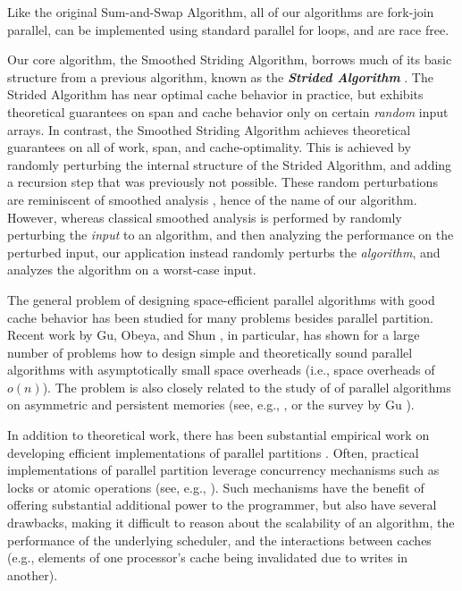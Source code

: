 \documentclass[a4paper,UKenglish,cleveref, autoref, thm-restate]{lipics-v2019}
\newcommand{\defn}[1]{{\textit{\textbf{\boldmath #1}}}}
\renewcommand{\paragraph}[1]{\vspace{0.09in}\noindent{\bf \boldmath #1.}}
\begin{document}
Like the original Sum-and-Swap Algorithm, all of our algorithms are
fork-join parallel, can be implemented using standard parallel for
loops, and are race free.

\paragraph{Related Work}
Our core algorithm, the Smoothed Striding Algorithm, borrows much of
its basic structure from a previous algorithm, known as the
\defn{Strided Algorithm} \cite{FrancisPa92, Frias08}. The Strided
Algorithm has near optimal cache behavior in practice, but exhibits
theoretical guarantees on span and cache behavior only on certain
\emph{random} input arrays. In contrast, the Smoothed Striding
Algorithm achieves theoretical guarantees on all of work, span, and
cache-optimality. This is achieved by randomly perturbing the internal
structure of the Strided Algorithm, and adding a recursion step that
was previously not possible. These random perturbations are
reminiscent of smoothed analysis \cite{Smoothed1, Smoothed2,
  Smoothed3, Smoothed4, Smoothed5, Smoothed6}, hence of the name of our
algorithm. However, whereas classical smoothed analysis is performed
by randomly perturbing the \emph{input} to an algorithm, and then
analyzing the performance on the perturbed input, our application
instead randomly perturbs the \emph{algorithm}, and analyzes the
algorithm on a worst-case input.

The general problem of designing space-efficient parallel algorithms
with good cache behavior has been studied for many problems
\cite{blelloch2020improved, ParallelCacheAlg1, ParallelCacheAlg2,
  ParallelCacheAlg3, ParallelCacheAlg4, ParallelCacheAlg5,
  ParallelCacheAlg6} besides parallel partition. Recent work by Gu,
Obeya, and Shun \cite{inplace}, in particular, has shown for a large
number of problems how to design simple and theoretically sound
parallel algorithms with asymptotically small space overheads (i.e.,
space overheads of $o(n)$).  The problem is also closely related to
the study of of parallel algorithms on asymmetric and persistent
memories (see, e.g.,
\cite{blelloch2018parallel,ben2016parallel,blelloch2015sorting,gu2018survey,blelloch2018parallel2},
or the survey by Gu \cite{gu2018survey}).


In addition to theoretical work, there has been substantial empirical
work on developing efficient implementations of parallel partitions
\cite{HeidelbergerNo90, AxtmannWi17, TsigasZh03, FrancisPa92,
  Frias08}. Often, practical implementations of parallel partition
leverage concurrency mechanisms such as locks or atomic operations
(see, e.g., \cite{HeidelbergerNo90,AxtmannWi17,TsigasZh03}). Such
mechanisms have the benefit of offering substantial additional power
to the programmer, but also have several drawbacks, making it
difficult to reason about the scalability of an algorithm, the
performance of the underlying scheduler, and the interactions between
caches (e.g., elements of one processor's cache being invalidated due
to writes in another).
\end{document}
